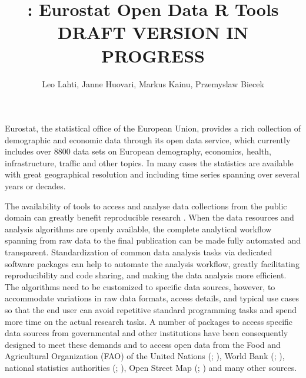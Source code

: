 \title{: Eurostat Open Data R Tools\\DRAFT VERSION IN PROGRESS}
\author{Leo Lahti, Janne Huovari, Markus Kainu, Przemyslaw Biecek}

\maketitle


Eurostat, the statistical office of the European Union, provides a
rich collection of demographic and economic data through its open data
service, which currently includes over 8800 data sets on European
demography, economics, health, infrastructure, traffic and other
topics. In many cases the statistics are available with great
geographical resolution and including time series spanning over
several years or decades.

The availability of tools to access and analyse data collections from
the public domain can greatly benefit reproducible
research \citep{Gandrud13, Boettiger2015}. When the data resources and
analysis algorithms are openly available, the complete analytical
workflow spanning from raw data to the final publication can be made
fully automated and transparent. Standardization of common data
analysis tasks via dedicated software packages can help to automate
the analysis workflow, greatly facilitating reproducibility and code
sharing, and making the data analysis more efficient. The algorithms
need to be customized to specific data sources, however, to
accommodate variations in raw data formats, access details, and
typical use cases so that the end user can avoid repetitive standard
programming tasks and spend more time on the actual research tasks. A
number of packages to access specific data sources from governmental
and other institutions have been consequently designed to meet these
demands and to access open data from the Food and Agricultural
Organization (FAO) of the United Nations
(; \cite{FAOSTAT}), World Bank
(; \cite{WDI}), national statistics authorities
(; \cite{pxweb}), Open Street Map
(; \cite{osmar}) and many other sources.

